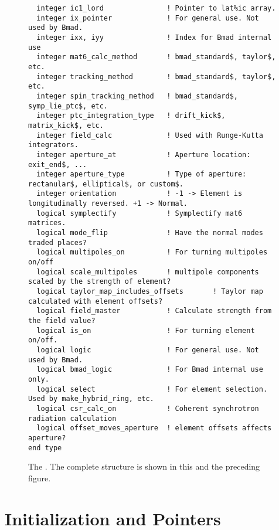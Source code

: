 \begin{figure}[tb]
\begin{verbatim}
  integer ic1_lord               ! Pointer to lat%ic array.
  integer ix_pointer             ! For general use. Not used by Bmad.
  integer ixx, iyy               ! Index for Bmad internal use
  integer mat6_calc_method       ! bmad_standard$, taylor$, etc.
  integer tracking_method        ! bmad_standard$, taylor$, etc.
  integer spin_tracking_method   ! bmad_standard$, symp_lie_ptc$, etc.
  integer ptc_integration_type   ! drift_kick$, matrix_kick$, etc.
  integer field_calc             ! Used with Runge-Kutta integrators.
  integer aperture_at            ! Aperture location: exit_end$, ...
  integer aperture_type          ! Type of aperture: rectanular$, elliptical$, or custom$. 
  integer orientation            ! -1 -> Element is longitudinally reversed. +1 -> Normal.
  logical symplectify            ! Symplectify mat6 matrices.
  logical mode_flip              ! Have the normal modes traded places?
  logical multipoles_on          ! For turning multipoles on/off
  logical scale_multipoles       ! multipole components scaled by the strength of element?
  logical taylor_map_includes_offsets       ! Taylor map calculated with element offsets?
  logical field_master           ! Calculate strength from the field value?
  logical is_on                  ! For turning element on/off.
  logical logic                  ! For general use. Not used by Bmad.
  logical bmad_logic             ! For Bmad internal use only.
  logical select                 ! For element selection. Used by make_hybrid_ring, etc.
  logical csr_calc_on            ! Coherent synchrotron radiation calculation
  logical offset_moves_aperture  ! element offsets affects aperture?          
end type
\end{verbatim}
\caption[The  (part 2).]{The . 
The complete structure is shown in this and the preceding figure.}
\label{f:ele.struct2}
\end{figure}

\section{Initialization and Pointers}

